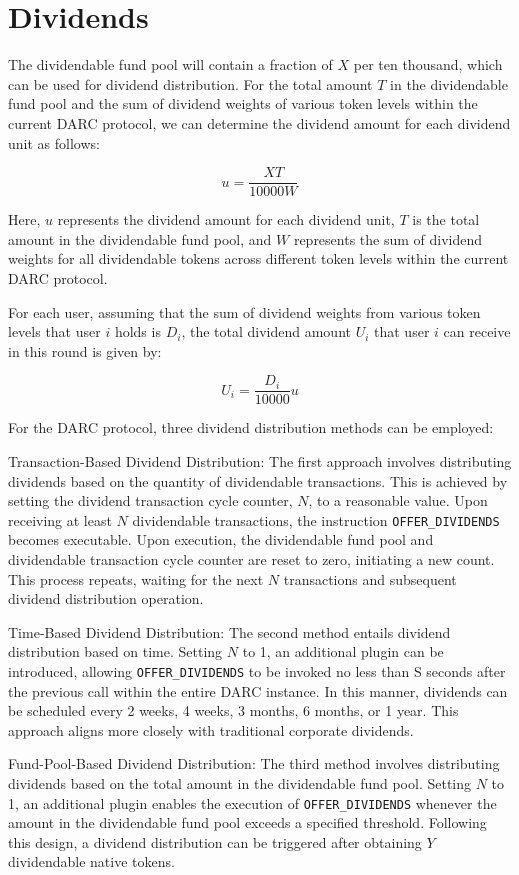 \documentclass[main.tex]{subfiles}
\begin{document}
\section{Dividends}

The dividendable fund pool will contain a fraction of $X$ per ten thousand, which can be used for dividend distribution. For the total amount $T$ in the dividendable fund pool and the sum of dividend weights of various token levels within the current DARC protocol, we can determine the dividend amount for each dividend unit as follows:

\[u = \frac{XT}{10000W}\]

Here, $u$ represents the dividend amount for each dividend unit, $T$ is the total amount in the dividendable fund pool, and $W$ represents the sum of dividend weights for all dividendable tokens across different token levels within the current DARC protocol.

For each user, assuming that the sum of dividend weights from various token levels that user $i$ holds is $D_i$, the total dividend amount $U_i$ that user $i$ can receive in this round is given by:

\[ U_i = \frac{D_i}{10000}u\]

For the DARC protocol, three dividend distribution methods can be employed:

Transaction-Based Dividend Distribution:
The first approach involves distributing dividends based on the quantity of dividendable transactions. This is achieved by setting the dividend transaction cycle counter, $N$, to a reasonable value. Upon receiving at least $N$ dividendable transactions, the instruction \texttt{OFFER\_DIVIDENDS} becomes executable. Upon execution, the dividendable fund pool and dividendable transaction cycle counter are reset to zero, initiating a new count. This process repeats, waiting for the next $N$ transactions and subsequent dividend distribution operation.

Time-Based Dividend Distribution:
The second method entails dividend distribution based on time. Setting $N$ to 1, an additional plugin can be introduced, allowing \texttt{OFFER\_DIVIDENDS} to be invoked no less than S seconds after the previous call within the entire DARC instance. In this manner, dividends can be scheduled every 2 weeks, 4 weeks, 3 months, 6 months, or 1 year. This approach aligns more closely with traditional corporate dividends.

Fund-Pool-Based Dividend Distribution:
The third method involves distributing dividends based on the total amount in the dividendable fund pool. Setting $N$ to 1, an additional plugin enables the execution of \texttt{OFFER\_DIVIDENDS} whenever the amount in the dividendable fund pool exceeds a specified threshold. Following this design, a dividend distribution can be triggered after obtaining $Y$ dividendable native tokens.
\end{document}
